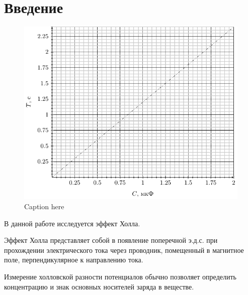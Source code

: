 



\def\labauthors{Понур К.А., Сарафанов Ф.Г., Сидоров Д.А.}
\def\labgroup{420}
\def\labnumber{000}
\def\labtheme{Эффект Холла}



\tableofcontents
\newpage

\section*{Введение}
\label{sec:input}

\begin{figure}[H]
	\centering
	\includegraphics[]{img/fig1}
	\caption{Caption here}
	\label{fig:figure1}
\end{figure}

В данной работе исследуется эффект Холла.

Эффект  Холла  представляет собой  в появление   поперечной    э.д.с.    при    прохождении 
электрического  тока  через  проводник,   помещенный   в   магнитное   поле, перпендикулярное к направлению тока. 

Измерение  холловской разности потенциалов  обычно  позволяет  определить  концентрацию  и знак основных носителей заряда в веществе.





